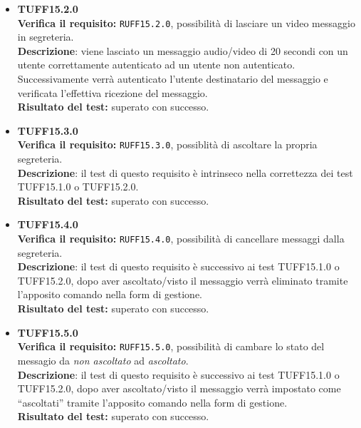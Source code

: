 \begin{itemize}
\item \textbf{TUFF15.2.0}\\
\textbf{Verifica il requisito:} \texttt{RUFF15.2.0}, possibilità di lasciare un video messaggio in segreteria.\\
\textbf{Descrizione}: viene lasciato un messaggio audio/video di 20 secondi con un utente  correttamente autenticato ad un utente  non autenticato. Successivamente verrà autenticato l'utente  destinatario del messaggio e verificata l'effettiva ricezione del messaggio.\\
\textbf{Risultato del test:} superato con successo.

\item \textbf{TUFF15.3.0}\\
\textbf{Verifica il requisito:} \texttt{RUFF15.3.0}, possiblità di ascoltare la propria segreteria.\\
\textbf{Descrizione}: il test di questo requisito è intrinseco nella correttezza dei test TUFF15.1.0 o TUFF15.2.0.\\
\textbf{Risultato del test:} superato con successo.

\item \textbf{TUFF15.4.0}\\
\textbf{Verifica il requisito:} \texttt{RUFF15.4.0}, possibilità di cancellare messaggi dalla segreteria.\\
\textbf{Descrizione}: il test di questo requisito è successivo ai test TUFF15.1.0 o TUFF15.2.0, dopo aver ascoltato/visto il messaggio verrà eliminato tramite l'apposito comando nella form di gestione.\\
\textbf{Risultato del test:} superato con successo.

\item \textbf{TUFF15.5.0}\\
\textbf{Verifica il requisito:} \texttt{RUFF15.5.0}, possibilità di cambare lo stato del messagio da \textit{non ascoltato} ad \textit{ascoltato}.\\
\textbf{Descrizione}: il test di questo requisito è successivo ai test TUFF15.1.0 o TUFF15.2.0, dopo aver ascoltato/visto il messaggio verrà impostato come ``ascoltati'' tramite l'apposito comando nella form di gestione.\\
\textbf{Risultato del test:} superato con successo.


\end{itemize}
